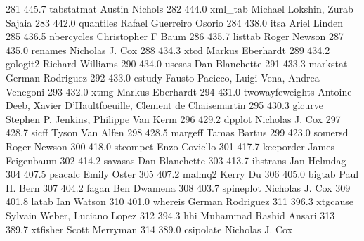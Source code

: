    281    445.7    tabstatmat    Austin Nichols                          
   282    444.0    xml_tab       Michael Lokshin, Zurab Sajaia           
   283    442.0    quantiles     Rafael Guerreiro Osorio                 
   284    438.0    itsa          Ariel Linden                            
   285    436.5    nbercycles    Christopher F Baum                      
   286    435.7    listtab       Roger Newson                            
   287    435.0    renames       Nicholas J. Cox                         
   288    434.3    xtcd          Markus Eberhardt                        
   289    434.2    gologit2      Richard Williams                        
   290    434.0    usesas        Dan Blanchette                          
   291    433.3    markstat      German Rodriguez                        
   292    433.0    estudy        Fausto Pacicco, Luigi Vena, Andrea      
                                   Venegoni                                
   293    432.0    xtmg          Markus Eberhardt                        
   294    431.0    twowayfeweights  Antoine Deeb, Xavier D'Haultfoeuille,   
                                   Clement de Chaisemartin                 
   295    430.3    glcurve       Stephen P. Jenkins, Philippe Van Kerm   
   296    429.2    dpplot        Nicholas J. Cox                         
   297    428.7    sicff         Tyson Van Alfen                         
   298    428.5    margeff       Tamas Bartus                            
   299    423.0    somersd       Roger Newson                            
   300    418.0    stcompet      Enzo Coviello                           
   301    417.7    keeporder     James Feigenbaum                        
   302    414.2    savasas       Dan Blanchette                          
   303    413.7    ihstrans      Jan Helmdag                             
   304    407.5    psacalc       Emily Oster                             
   305    407.2    malmq2        Kerry Du                                
   306    405.0    bigtab        Paul H. Bern                            
   307    404.2    fagan         Ben Dwamena                             
   308    403.7    spineplot     Nicholas J. Cox                         
   309    401.8    latab         Ian Watson                              
   310    401.0    whereis       German Rodriguez                        
   311    396.3    xtgcause      Sylvain Weber, Luciano Lopez            
   312    394.3    hhi           Muhammad Rashid Ansari                  
   313    389.7    xtfisher      Scott Merryman                          
   314    389.0    csipolate     Nicholas J. Cox                         
